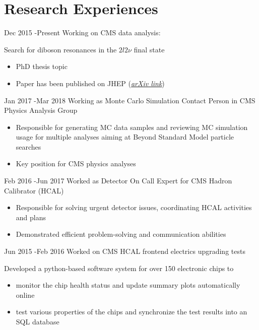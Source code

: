 \documentclass[10pt]{article} %
\begin{document}
\section{Research Experiences}
\job
{Dec 2015 -}{Present}
{Working on CMS data analysis:}
{Search for diboson resonances in the $2l2\nu$ final state
\begin{itemize}
\item PhD thesis topic
\item Paper has been published on JHEP (\href{https://arxiv.org/abs/1711.04370}{\textit{arXiv link}})
\end{itemize}}
\job
{Jan 2017 -}{Mar 2018}
{Working as Monte Carlo Simulation Contact Person in CMS Physics Analysis Group}
{
\begin{itemize}
\item Responsible for generating MC data samples and reviewing MC simulation usage for multiple analyses aiming at Beyond Standard Model particle searches
\item Key position for CMS physics analyses
\end{itemize}}
\job
{Feb 2016 -}{Jun 2017}
{Worked as Detector On Call Expert for CMS Hadron Calibrator (HCAL)}
{
\begin{itemize}
\item Responsible for solving urgent detector issues, coordinating HCAL activities and plans
\item Demonstrated efficient problem-solving and communication abilities
\end{itemize}}
\job
{Jun 2015 -}{Feb 2016}
{Worked on CMS HCAL frontend electrics upgrading tests}
{Developed a python-based software system for over 150 electronic chips to
\begin{itemize}
\item monitor the chip health status and update summary plots automatically online
\item test various properties of the chips and synchronize the test results into an SQL database
\end{itemize}
}
\end{document}
